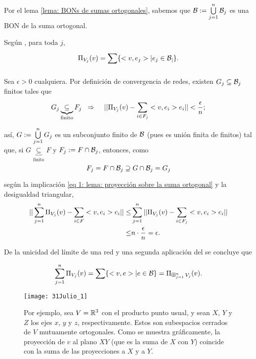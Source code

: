 Por el lema \ref{lema: BONs de sumas ortogonales}, sabemos
que $\mathcal{B}:= \bigcup\limits_{j=1}^{n}{\mathcal{B}_{j}}$
es una BON de la suma ortogonal.

Según ,
para toda $j$,
\[
\Pi_{V_{j}}(v)= \sum\limits_{}^{}\{ <v, e_{j}> | e_{j} \in \mathcal{B_{j}} \}.
\]

Sea $\epsilon>0$ cualquiera. Por definición de convergencia
de redes, existen $G_{j} \subseteq \mathcal{B}_{j}$
finitos tales que
\begin{equation} \label{eq 1: lema: proyección sobre la suma ortogonal}
G_{j} \underbrace{\subseteq}_{\text{finito}} F_{j} \hspace{0.2cm}
\Rightarrow \hspace{0.4cm}
|| \Pi_{V_{j}}(v)- \sum\limits_{i \in F_{j}}^{}<v, e_{i}>e_{i}  || < 
\frac{\epsilon}{n};
\end{equation}


así, $G:=\bigcup\limits_{j=1}^{n}{G_{j}}$ es un subconjunto finito de 
$\mathcal{B}$ (pues es unión finita de finitos) tal que,
si $G\underbrace{\subseteq}_{\text{finito}} F$
y $F_{j} := F \cap \mathcal{B}_{j}$, entonces, 
como
\[
F_{j} = F \cap \mathcal{B}_{j} \supseteq 
G \cap \mathcal{B}_{j} = G_{j}
\]

según la implicación 
\eqref{eq 1: lema: proyección sobre la suma ortogonal}
 y la desigualdad triangular, 
\begin{align*}
|| \sum\limits_{j=1}^{n}\Pi_{V_{j}}(v) - \sum\limits_{i \in F}^{}<v, e_{i}>e_{i} ||
\leq &  \sum\limits_{j=1}^{n}||\Pi_{V_{j}}(v)- \sum\limits_{i \in F_{j}}^{}<v, e_{i}>e_{i}|| \\
\leq & n \cdot \frac{\epsilon}{n} = \epsilon.
\end{align*}

De la unicidad del límite de una red
y una segunda aplicación del 
se concluye que

\[
\sum\limits_{j=1}^{n}\Pi_{V_{j}}(v) = 
\sum\limits_{}^{}\{ <v, e> | e \in \mathcal{B} \} = \Pi_{\operatorname*{{\boxplus}}_{j =1 }^{n} V_{j}}(v).
\]


\begin{figure}[H]
	\centering
	\texttt{[image: 31Julio\_1]}
	\caption{Por ejemplo, sea $V= \mathbb{R}^{3}$ con el producto
	punto usual, y sean  $X$, $Y$ y $Z$ los ejes
	$x$, $y$ y $z$, respectivamente.
	Estos son subespacios cerrados de $V$ mutuamente ortogonales. Como
	se muestra gráficamente, la proyección de $v$ al plano $XY$
	(que es la suma de $X$ con $Y$) coincide con la suma
	de las proyecciones a $X$ y a $Y$.}
\end{figure}


